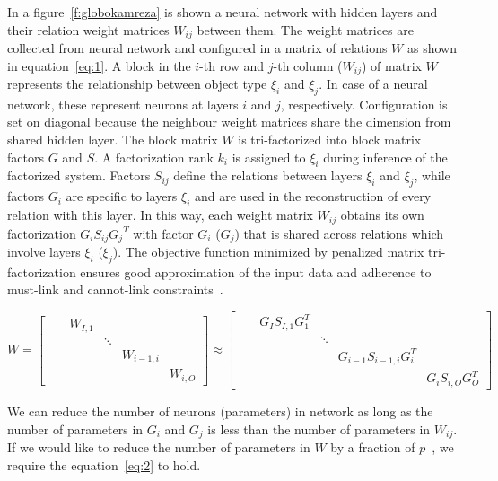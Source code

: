 \documentclass{article} %
\begin{document}
In a figure~\ref{f:globokamreza} is shown a neural network with hidden
layers and their relation weight matrices $W_{ij}$ between them. The weight
matrices are collected from neural network and configured in a matrix of
relations $W$ as shown in equation~\ref{eq:1}. A block in the $i$-th
row and $j$-th column ($W_{ij}$) of matrix $W$ represents the relationship
between object type $\xi_i$ and $\xi_j$. In case of a neural network, these
represent neurons at layers $i$ and $j$, respectively. Configuration is set on
diagonal because the neighbour weight matrices share the dimension from shared
hidden layer. The block matrix $W$ is
tri-factorized into block matrix factors $G$ and $S$. A factorization rank
$k_i$ is assigned to $\xi_i$ during inference of the factorized system. Factors
$S_{ij}$ define the relations between layers $\xi_i$ and $\xi_j$, while
factors $G_i$ are specific to layers $\xi_i$ and are used in the
reconstruction of every relation with this layer. In this way, each
weight matrix $W_{ij}$ obtains its own factorization $G_i S_{ij} {G_j}^T$ with
factor $G_i$ ($G_j$) that is shared across relations which involve layers
$\xi_i$ ($\xi_j$). The objective function minimized by penalized matrix
tri-factorization ensures good approximation of the input data and adherence to
must-link and cannot-link constraints~\cite{zitnik2015data}.

\begin{equation} \label{eq:1}
W = 
\begin{bmatrix} 
& &W_{I,1} & & & \\
& & &\ddots & & \\ 
& & & &W_{i-1,i} & \\ 
& & & & &W_{i,O} 
\end{bmatrix} 
\approx 
\begin{bmatrix} 
& &G_IS_{I,1}G_1^T & & & \\ 
& & &\ddots & & \\ 
& & & &G_{i-1}S_{i-1,i}G_i^T & \\ 
& & & & &G_iS_{i,O}G_O^T 
\end{bmatrix}
\end{equation}



We can reduce
the number of neurons (parameters) in network as long as the number of parameters
in $G_i$ and $G_j$ is less than the number of parameters in $W_{ij}$. If we would
like to reduce the number of parameters in $W$ by a fraction of
$p$~\cite{sainath2013low}, we require the equation~\ref{eq:2} to hold.
\end{document}
